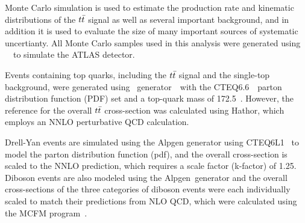 Monte Carlo simulation is used to estimate the production rate and kinematic distributions of the $t\bar{t}$ signal as well as several important background, 
and in addition it is used to evaluate the size of many important sources of systematic uncertianty.
All Monte Carlo samples used in this analysis were generated using \GEANT~\cite{geant4}\
to simulate the ATLAS detector.



Events containing top quarks, including the $t\bar{t}$ signal and the single-top background,
were generated using \MCatNLO\ generator~\cite{mcatnlo1,Frixione:2003ei,Frixione:2005vw}\
with the CTEQ6.6~\cite{cteq66}\ parton distribution function (PDF)
set and a top-quark mass of 172.5~\GeV.
However, the reference for the overall $t\bar{t}$ cross-section was calculated using
{\sc Hathor}\cite{Aliev:2010}, which employs an NNLO perturbative QCD calculation.



Drell-Yan events are simulated using the {\sc Alpgen} generator using
CTEQ6L1 \cite{cteq6l}\ to model the parton distribution function (pdf),
and the overall cross-section is scaled to the NNLO prediction, which
requires a scale factor (k-factor) of 1.25.
Diboson events are also modeled using the {\sc Alpgen}\ generator
and the overall cross-sections of the three categories of diboson events
were each individually scaled to match their predictions from NLO QCD,
which were calculated using the MCFM program~\cite{Campbell:1999ah}.

